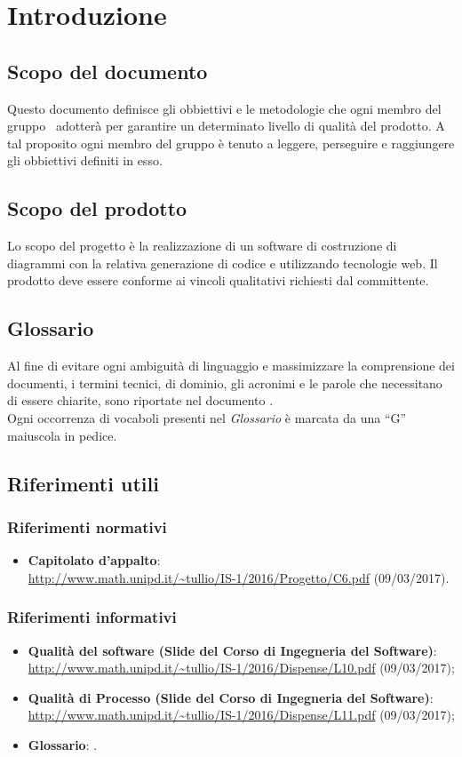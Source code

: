 \documentclass[../PianoDiQualifica.tex]{subfiles}
\begin{document}
	\section{Introduzione}
		\subsection{Scopo del documento} 
			Questo documento definisce gli obbiettivi e le metodologie che ogni membro del gruppo
			\kaleidoscode\ adotterà per garantire un determinato livello di qualità del prodotto.
			A tal proposito ogni membro del gruppo è tenuto a leggere, perseguire e raggiungere gli obbiettivi definiti in esso.
		\subsection{Scopo del prodotto}
			Lo scopo del progetto è la realizzazione di un software di
			costruzione di diagrammi  con la relativa generazione
			di codice  e  utilizzando tecnologie
			web. Il prodotto deve essere conforme ai vincoli qualitativi richiesti dal committente.
		\subsection{Glossario}
			Al fine di evitare ogni ambiguità di linguaggio e massimizzare la
			comprensione dei documenti, i termini tecnici, di dominio, gli
			acronimi e le parole che necessitano di essere chiarite, sono
			riportate nel documento \glossariov.\\
			Ogni occorrenza di vocaboli presenti nel \textit{Glossario} è
			marcata da una ``G'' maiuscola in pedice.
		\subsection{Riferimenti utili}
			\subsubsection{Riferimenti normativi}
    			\begin{itemize}
    				\item \textbf{Capitolato d'appalto}:\\
    				\url{http://www.math.unipd.it/~tullio/IS-1/2016/Progetto/C6.pdf} (09/03/2017).
				\end{itemize}
			\subsubsection{Riferimenti informativi}	
				\begin{itemize}
					\item \textbf{Qualità del software (Slide del Corso di Ingegneria del Software)}:\\
					\url{http://www.math.unipd.it/~tullio/IS-1/2016/Dispense/L10.pdf} (09/03/2017);
					\item \textbf{Qualità di Processo (Slide del Corso di Ingegneria del Software)}:\\
					\url{http://www.math.unipd.it/~tullio/IS-1/2016/Dispense/L11.pdf} (09/03/2017);
					\item \textbf{Glossario}: \glossariov.
				\end{itemize}
\end{document}
